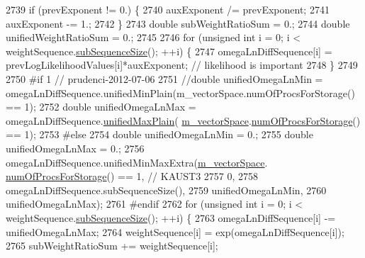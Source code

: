 \begin{DoxyCode}
2739         \textcolor{keywordflow}{if} (prevExponent != 0.) \{
2740           auxExponent /= prevExponent;
2741           auxExponent -= 1.;
2742         \}
2743         \textcolor{keywordtype}{double} subWeightRatioSum     = 0.;
2744         \textcolor{keywordtype}{double} unifiedWeightRatioSum = 0.;
2745 
2746         \textcolor{keywordflow}{for} (\textcolor{keywordtype}{unsigned} \textcolor{keywordtype}{int} i = 0; i < weightSequence.\hyperlink{class_q_u_e_s_o_1_1_scalar_sequence_a0288ea295eedc216a1617b3286f6f3a0}{subSequenceSize}(); ++i) \{
2747           omegaLnDiffSequence[i] = prevLogLikelihoodValues[i]*auxExponent; \textcolor{comment}{// likelihood is important}
2748         \}
2749 
2750 \textcolor{preprocessor}{#if 1 // prudenci-2012-07-06}
2751 \textcolor{preprocessor}{}      \textcolor{comment}{//double unifiedOmegaLnMin = omegaLnDiffSequence.unifiedMinPlain(m\_vectorSpace.numOfProcsForStorage()
       == 1);}
2752         \textcolor{keywordtype}{double} unifiedOmegaLnMax = omegaLnDiffSequence.\hyperlink{class_q_u_e_s_o_1_1_scalar_sequence_a70dd5db8c036d364ac56e3cb9c2c7d04}{unifiedMaxPlain}(
      \hyperlink{class_q_u_e_s_o_1_1_m_l_sampling_a7bc4c72f65ba9166ed94a6e198b0915b}{m\_vectorSpace}.\hyperlink{class_q_u_e_s_o_1_1_vector_space_a67b0c3620662116f5a346fdaa5faf38e}{numOfProcsForStorage}() == 1);
2753 \textcolor{preprocessor}{#else}
2754 \textcolor{preprocessor}{}        \textcolor{keywordtype}{double} unifiedOmegaLnMin = 0.;
2755         \textcolor{keywordtype}{double} unifiedOmegaLnMax = 0.;
2756         omegaLnDiffSequence.unifiedMinMaxExtra(\hyperlink{class_q_u_e_s_o_1_1_m_l_sampling_a7bc4c72f65ba9166ed94a6e198b0915b}{m\_vectorSpace}.
      \hyperlink{class_q_u_e_s_o_1_1_vector_space_a67b0c3620662116f5a346fdaa5faf38e}{numOfProcsForStorage}() == 1, \textcolor{comment}{// KAUST3}
2757                                                0,
2758                                                omegaLnDiffSequence.subSequenceSize(),
2759                                                unifiedOmegaLnMin,
2760                                                unifiedOmegaLnMax);
2761 \textcolor{preprocessor}{#endif}
2762 \textcolor{preprocessor}{}        \textcolor{keywordflow}{for} (\textcolor{keywordtype}{unsigned} \textcolor{keywordtype}{int} i = 0; i < weightSequence.\hyperlink{class_q_u_e_s_o_1_1_scalar_sequence_a0288ea295eedc216a1617b3286f6f3a0}{subSequenceSize}(); ++i) \{
2763           omegaLnDiffSequence[i] -= unifiedOmegaLnMax;
2764           weightSequence[i] = exp(omegaLnDiffSequence[i]);
2765           subWeightRatioSum += weightSequence[i];

\end{DoxyCode}
